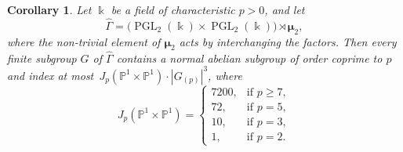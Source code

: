 \documentclass[12pt]{amsart}
\numberwithin{equation}{section}
\newtheorem{corollary}[subsection]{Corollary}
\theoremstyle{definition}
\newcommand{\mumu}{\boldsymbol{\mu}}
\newcommand{\PP}{\mathbb P}
\DeclareMathOperator{\PGL}{PGL}
\def \ge {\geqslant}
\begin{document}
\begin{corollary}\label{corollary:P1xP1}
Let $\Bbbk$ be a field of characteristic $p>0$, and let
$$
\hat{\Gamma}=\big(\PGL_2(\Bbbk)\times\PGL_2(\Bbbk)\big)\rtimes\mumu_2,
$$
where the non-trivial element of $\mumu_2$ acts by interchanging the factors.
Then every finite subgroup $G$ of $\hat{\Gamma}$ contains
a normal abelian subgroup of order coprime to $p$
and index at most~\mbox{$J_p(\PP^1\times\PP^1)\cdot |G_{(p)}|^{3}$},
where
\begin{equation}\label{eq:J-P1xP1}
J_p(\PP^1\times\PP^1)=\begin{cases}
7200, &\text{if\ } p\ge 7,\\
72, &\text{if\ } p=5,\\
10, &\text{if\ } p=3,\\
1, &\text{if\ } p=2.
\end{cases}
\end{equation}
\end{corollary}
\end{document}
